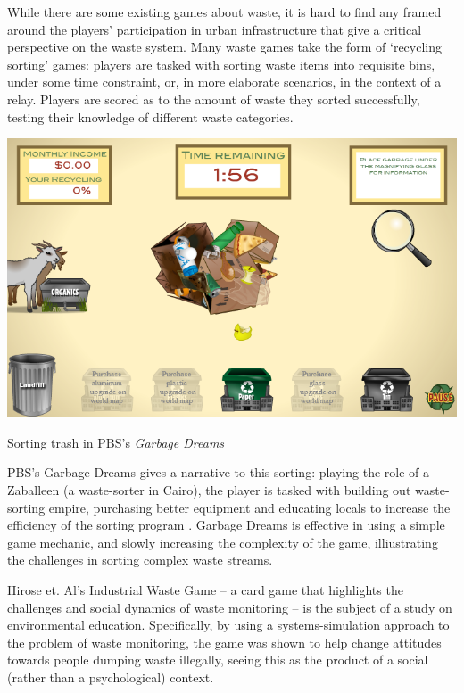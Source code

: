 \documentclass[nofonts,nols,justified,nobib]{tufte-book}
\begin{document}
While there are some existing games about waste, it is hard to find any framed around the players' participation in urban infrastructure that give a critical perspective on the waste system. Many waste games take the form of `recycling sorting' games: players are tasked with sorting waste items into requisite bins, under some time constraint, or, in more elaborate scenarios, in the context of a relay. Players are scored as to the amount of waste they sorted successfully, testing their knowledge of different waste categories. 

\begin{marginfigure}
\includegraphics[width=\textwidth]{img/1/garbage-dreams-1.png}
\caption{Sorting trash in PBS's \emph{Garbage Dreams} \cite{iskander_garbage_2011}}
\end{marginfigure}

PBS's Garbage Dreams gives a narrative to this sorting: playing the role of a Zaballeen (a waste-sorter in Cairo), the player is tasked with building out waste-sorting empire, purchasing better equipment and educating locals to increase the efficiency of the sorting program \cite{iskander_garbage_2011}. Garbage Dreams is effective in using a simple game mechanic, and slowly increasing the complexity of the game, illiustrating the challenges in sorting complex waste streams. 

Hirose et. Al's Industrial Waste Game \cite{hirose_industrial_2004} -- a card game that highlights the challenges and social dynamics of waste monitoring -- is the subject of a study on environmental education. Specifically, by using a systems-simulation approach to the problem of waste monitoring, the game was shown to help change attitudes towards people dumping waste illegally, seeing this as the product of a social (rather than a psychological) context. 
\end{document}
